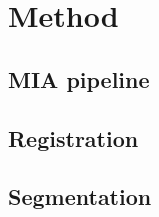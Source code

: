 \section*{Method}

\subsection*{MIA pipeline}

\subsection*{Registration}

\subsection*{Segmentation}